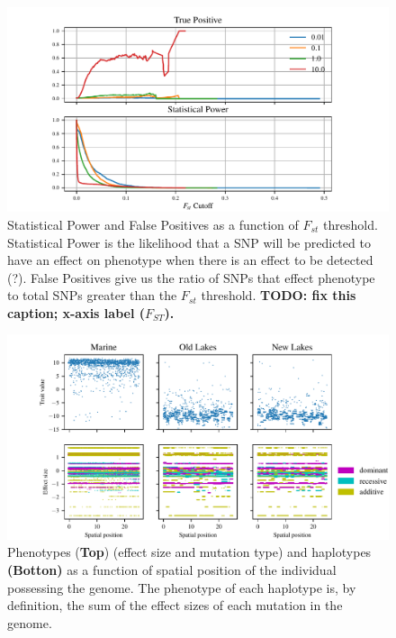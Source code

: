 \documentclass{article}
\begin{document}
\begin{figure}
    \begin{center}
        \includegraphics{Final_Plots/True_Power_0_5_500.pdf}
          \caption{ 
        Statistical Power and False Positives as a function of $F_{st}$ threshold. 
        Statistical Power is the likelihood that a SNP will be predicted to have an effect on phenotype when there is an effect to be detected (?).
        False Positives give us the ratio of SNPs that effect phenotype to total SNPs greater than the $F_{st}$ threshold.
            \textbf{
                TODO: fix this caption; x-axis label ($F_{ST}$).}
        }
          \label{fig:Power_FP_5lakes}
    \end{center}
\end{figure}

\begin{figure}
    \begin{center}
          \includegraphics[width=1.0\linewidth]{Final_Plots/Haplo_small.pdf}
          \caption{
            Phenotypes (\textbf{Top}) (effect size and mutation type) and haplotypes \textbf{(Botton)} as a function of spatial position of the individual 
            possessing the genome. The phenotype of each haplotype is, by definition, the sum of the 
            effect sizes of each mutation in the genome. 
        }
          \label{fig:Haplo_Pheno}
    \end{center}
\end{figure}
\end{document}
